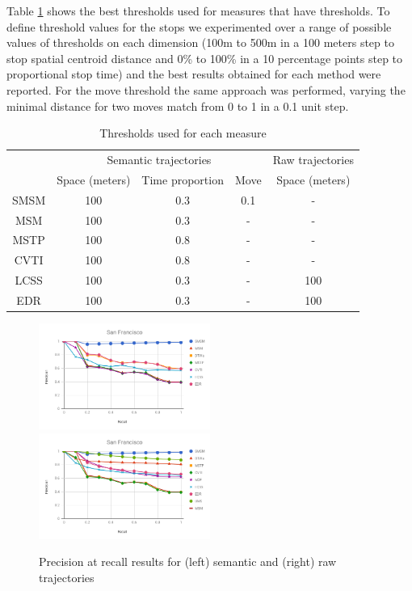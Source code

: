 \documentclass[12pt]{article}
\begin{document}
Table \ref{tab:san_francisco_thresholds} shows the best thresholds used for measures that have thresholds. To define threshold values for the stops we experimented over a range of possible values of thresholds on each dimension (100m to 500m in a 100 meters step to stop spatial centroid distance and 0\% to 100\% in a 10 percentage points step to proportional stop time) and the best results obtained for each method were reported. For the move threshold the same approach was performed, varying the minimal distance for two moves match from 0 to 1 in a 0.1 unit step.

\begin{table}[!h]
\scriptsize
  \centering
  \begin{tabular}{|c|c|c|c|c|}
  	\hline
  & \multicolumn{3}{c|}{Semantic trajectories} & \multicolumn{1}{c|}{Raw trajectories} \\
 	\cline{2-5}
  & Space (meters) & Time proportion & Move & Space (meters) \\
  	\hline
 SMSM & 100 & 0.3 & 0.1 & - \\
 MSM & 100 & 0.3 & - & - \\
 MSTP & 100 & 0.8 & - & -  \\
 CVTI & 100 & 0.8 & - & -  \\
 LCSS & 100 & 0.3 & - & 100 \\
 EDR & 100 & 0.3 & - & 100 \\
    \hline
  \end{tabular}
  \caption{Thresholds used for each measure}
  \label{tab:san_francisco_thresholds}
\end{table}

\begin{figure}[ht!]
\centering
\centerline{
\includegraphics[width=0.5\textwidth]{Images/P_R-chart_San_Francisco.png}
\includegraphics[width=0.5\textwidth]{Images/P_R-chart_San_Francisco-raw.png}
}
\caption{Precision at recall results for (left) semantic and (right) raw trajectories}
\label{fig:sanfrancisco_precision_recall}
\end{figure}
\end{document}
